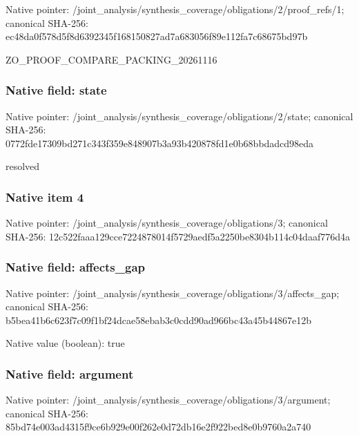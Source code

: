 \documentclass[10pt,a4paper]{article}
\begin{document}
Native pointer: /joint\_analysis/synthesi\allowbreak{}s\_coverage/obligations/2\allowbreak{}/proof\_refs/1; canonical SHA-256: ec48da0f578d5f8d6392345f\allowbreak{}168150827ad7a683056f89e1\allowbreak{}12fa7c68675bd97b


ZO\_PROOF\_COMPARE\_PACKING\_20261116


\subsubsection{Native field: state}


Native pointer: /joint\_analysis/synthesi\allowbreak{}s\_coverage/obligations/2\allowbreak{}/state; canonical SHA-256: 0772fde17309bd271c343f35\allowbreak{}9e848907b3a93b420878fd1e\allowbreak{}0b68bbdadcd98eda


resolved


\subsubsection{Native item 4}


Native pointer: /joint\_analysis/synthesi\allowbreak{}s\_coverage/obligations/3; canonical SHA-256: 12c522faaa129cce72248780\allowbreak{}14f5729aedf5a2250be8304b\allowbreak{}114c04daaf776d4a



\subsubsection{Native field: affects\_gap}


Native pointer: /joint\_analysis/synthesi\allowbreak{}s\_coverage/obligations/3\allowbreak{}/affects\_gap; canonical SHA-256: b5bea41b6c623f7c09f1bf24\allowbreak{}dcae58ebab3c0cdd90ad966b\allowbreak{}c43a45b44867e12b



Native value (boolean): true



\subsubsection{Native field: argument}


Native pointer: /joint\_analysis/synthesi\allowbreak{}s\_coverage/obligations/3\allowbreak{}/argument; canonical SHA-256: 85bd74e003ad4315f9ce6b92\allowbreak{}9e00f262e0d72db16e2f922b\allowbreak{}ed8e0b9760a2a740
\end{document}
